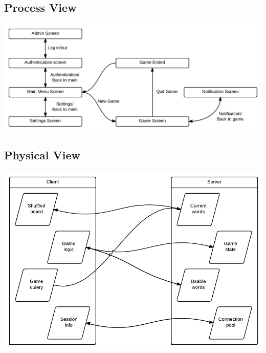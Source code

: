 \subsection{Process View}
\begin{center}
\includegraphics[clip=true, width=0.9 \textwidth]{assets/ProcessView.png}
\label{ref:gantt}
\end{center}
\subsection{Physical View}
\begin{center}
\includegraphics[clip=true, width=0.9 \textwidth]{assets/PhysicalView.pdf}
\label{ref:gantt}
\end{center}
